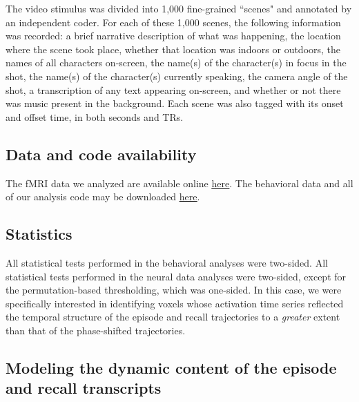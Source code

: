 \documentclass{article}
\begin{document}
The video stimulus was divided into 1,000 fine-grained ``scenes" and annotated by an independent coder.  For each of these 1,000 scenes, the following information was recorded: a brief narrative description of what was happening, the location where the scene took place, whether that location was indoors or outdoors, the names of all characters on-screen, the name(s) of the character(s) in focus in the shot, the name(s) of the character(s) currently speaking, the camera angle of the shot, a transcription of any text appearing on-screen, and whether or not there was music present in the background.  Each scene was also tagged with its onset and offset time, in both seconds and TRs.

\subsection*{Data and code availability}
The fMRI data we analyzed are available online \href{http://dataspace.princeton.edu/jspui/handle/88435/dsp01nz8062179}{\underline{here}}.  The behavioral data and all of our analysis code may be downloaded \href{https://github.com/ContextLab/sherlock-topic-model-paper}{\underline{here}}.

\subsection*{Statistics}
All statistical tests performed in the behavioral analyses were two-sided.  All statistical tests performed in the neural data analyses were two-sided, except for the permutation-based thresholding, which was one-sided.  In this case, we were specifically interested in identifying voxels whose activation time series reflected the temporal structure of the episode and recall trajectories to a \textit{greater} extent than that of the phase-shifted trajectories.

\subsection*{Modeling the dynamic content of the episode and recall transcripts}
\end{document}
